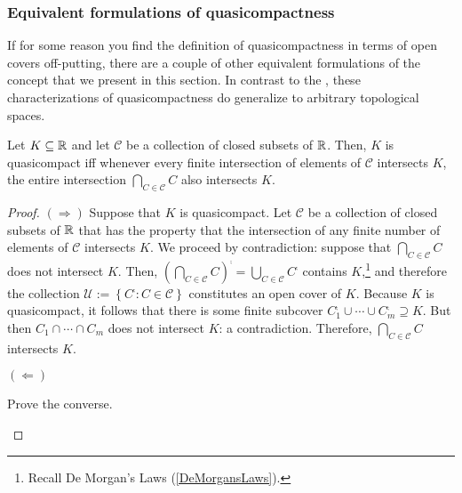 \subsubsection{Equivalent formulations of quasicompactness}

If for some reason you find the definition of quasicompactness in terms of open covers off-putting, there are a couple of other equivalent formulations of the concept that we present in this section.  In contrast to the , these characterizations of quasicompactness do generalize to arbitrary topological spaces.
\begin{prp}\label{prp3.4.58}
Let $K\subseteq \mathbb{R}$ and let $\mathcal{C}$ be a collection of closed subsets of $\mathbb{R}$.  Then, $K$ is quasicompact iff whenever every finite intersection of elements of $\mathcal{C}$ intersects $K$, the entire intersection $\bigcap _{C\in \mathcal{C}}C$ also intersects $K$.
\begin{proof}
$(\Rightarrow )$ Suppose that $K$ is quasicompact.  Let $\mathcal{C}$ be a collection of closed subsets of $\mathbb{R}$ that has the property that the intersection of any finite number of elements of $\mathcal{C}$ intersects $K$.  We proceed by contradiction:  suppose that $\bigcap _{C\in \mathcal{C}}C$ does not intersect $K$.  Then, $\left( \bigcap _{C\in \mathcal{C}}C\right) ^{\comp}=\bigcup _{C\in \mathcal{C}}C^{\comp}$ contains $K$,\footnote{Recall De Morgan's Laws (\cref{DeMorgansLaws}).} and therefore the collection $\mathcal{U}:=\left\{ C^{\comp}:C\in \mathcal{C}\right\}$ constitutes an open cover of $K$.  Because $K$ is quasicompact, it follows that there is some finite subcover $C_1^{\comp}\cup \cdots \cup C_m^{\comp}\supseteq K$.  But then $C_1\cap \cdots \cap C_m$ does not intersect $K$:  a contradiction.  Therefore, $\bigcap _{C\in \mathcal{C}}C$ intersects $K$.

\blankline
\noindent
$(\Leftarrow )$
\begin{exr}
Prove the converse.
\end{exr}
\end{proof}
\end{prp}
